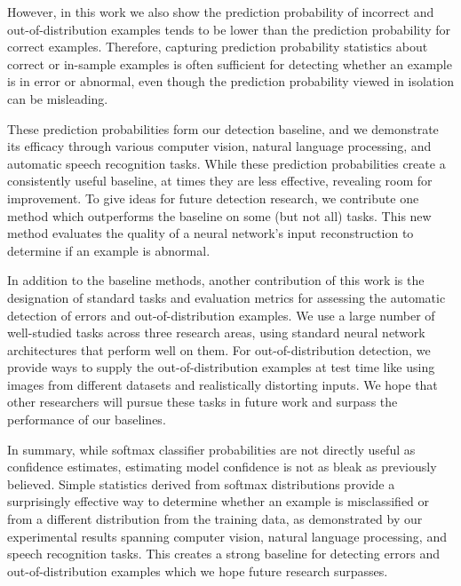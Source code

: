 \documentclass{article}
\begin{document}
However, in this work we also show the prediction probability of incorrect and out-of-distribution examples tends to be lower than the prediction probability for correct examples. Therefore, capturing prediction probability statistics about correct or in-sample examples is often sufficient for detecting whether an example is in error or abnormal, even though the prediction probability viewed in isolation can be misleading.

These prediction probabilities form our detection baseline, and we demonstrate its efficacy through various computer vision, natural language processing, and automatic speech recognition tasks. While these prediction probabilities create a consistently useful baseline, at times they are less effective, revealing room for improvement. To give ideas for future detection research, we 
contribute one method which outperforms the baseline on some (but not all) tasks. This new method evaluates the quality of a neural network's input reconstruction to determine if an example is abnormal.

In addition to the baseline methods, another contribution of this work is the designation of standard tasks and evaluation metrics for assessing the automatic detection of errors and out-of-distribution examples. We use a large number of well-studied tasks across three research areas, using standard neural network architectures that perform well on them. For out-of-distribution detection, we provide ways to supply the out-of-distribution examples at test time like using images from different datasets and realistically distorting inputs. 
We hope that other researchers will pursue these tasks in future work and surpass the performance of our baselines. 


In summary, while softmax classifier probabilities are not directly useful as confidence estimates, estimating model confidence is not as bleak as previously believed. Simple statistics derived from softmax distributions provide a surprisingly effective way to determine whether an example is misclassified or from a different distribution from the training data, as demonstrated by our experimental results spanning computer vision, natural language processing, and speech recognition tasks. This creates a strong baseline for detecting errors and out-of-distribution examples which we hope future research surpasses. 
\end{document}
